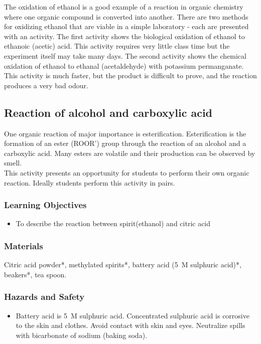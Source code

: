 The oxidation of ethanol is a good example of a reaction in organic chemistry where one organic compound is converted into another. There are two methods for oxidizing ethanol that are viable in a simple laboratory - each are presented with an activity. The first activity shows the biological oxidation of ethanol to ethanoic (acetic) acid. This activity requires very little class time but the experiment itself may take many days. The second activity shows the chemical oxidation of ethanol to ethanal (acetaldehyde) with potassium permanganate. This activity is much faster, but the product is difficult to prove, and the reaction produces a very bad odour.

\subsection{Reaction of alcohol and carboxylic acid}

One organic reaction of major importance is esterification. Esterification is the formation of an ester (ROOR') group through the reaction of an alcohol and a carboxylic acid. Many esters are volatile and their production can be observed by smell.\\
This activity presents an opportunity for students to perform their own organic reaction. Ideally students perform this activity in pairs.

\subsubsection*{Learning Objectives}
\begin{itemize}
\item{To describe the reaction between spirit(ethanol) and citric acid}
\end{itemize}

\subsubsection*{Materials}
Citric acid powder*, methylated spirits*, battery acid (5~M sulphuric acid)*, beakers*, tea spoon.

\subsubsection*{Hazards and Safety}
\begin{itemize}
\item{Battery acid is 5~M sulphuric acid. Concentrated sulphuric acid is corrosive to the skin and clothes. Avoid contact with skin and eyes. Neutralize spills with bicarbonate of sodium (baking soda).}
\end{itemize}

